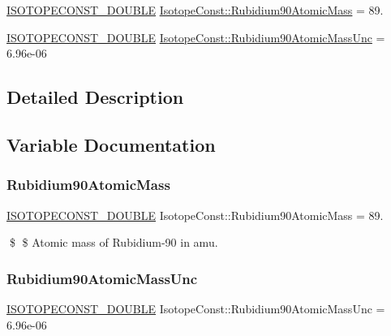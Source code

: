 \begin{DoxyCompactItemize}
\item 
\mbox{\hyperlink{group___isotope_const-_macros_ga8f45a7272ce02c0b4c65c44636ed719a}{I\+S\+O\+T\+O\+P\+E\+C\+O\+N\+S\+T\+\_\+\+D\+O\+U\+B\+LE}} \mbox{\hyperlink{group___isotope_const-_rubidium-_rb90_ga9031a90416132f7fb7297e56125307ce}{Isotope\+Const\+::\+Rubidium90\+Atomic\+Mass}} = 89.
\item 
\mbox{\hyperlink{group___isotope_const-_macros_ga8f45a7272ce02c0b4c65c44636ed719a}{I\+S\+O\+T\+O\+P\+E\+C\+O\+N\+S\+T\+\_\+\+D\+O\+U\+B\+LE}} \mbox{\hyperlink{group___isotope_const-_rubidium-_rb90_gac6f75d15ede3c70be298bbd1d05bf289}{Isotope\+Const\+::\+Rubidium90\+Atomic\+Mass\+Unc}} = 6.\+96e-\/06
\end{DoxyCompactItemize}


\subsection{Detailed Description}


\subsection{Variable Documentation}
\mbox{\label{group___isotope_const-_rubidium-_rb90_ga9031a90416132f7fb7297e56125307ce}} 
\subsubsection{\texorpdfstring{Rubidium90\+Atomic\+Mass}{Rubidium90AtomicMass}}
{\footnotesize\ttfamily \mbox{\hyperlink{group___isotope_const-_macros_ga8f45a7272ce02c0b4c65c44636ed719a}{I\+S\+O\+T\+O\+P\+E\+C\+O\+N\+S\+T\+\_\+\+D\+O\+U\+B\+LE}} Isotope\+Const\+::\+Rubidium90\+Atomic\+Mass = 89.}

\$ \$ Atomic mass of Rubidium-\/90 in amu. \mbox{\label{group___isotope_const-_rubidium-_rb90_gac6f75d15ede3c70be298bbd1d05bf289}} 
\subsubsection{\texorpdfstring{Rubidium90\+Atomic\+Mass\+Unc}{Rubidium90AtomicMassUnc}}
{\footnotesize\ttfamily \mbox{\hyperlink{group___isotope_const-_macros_ga8f45a7272ce02c0b4c65c44636ed719a}{I\+S\+O\+T\+O\+P\+E\+C\+O\+N\+S\+T\+\_\+\+D\+O\+U\+B\+LE}} Isotope\+Const\+::\+Rubidium90\+Atomic\+Mass\+Unc = 6.\+96e-\/06}


